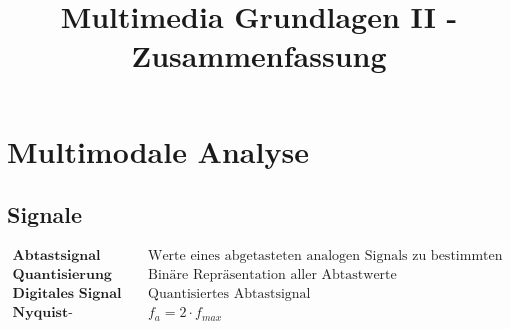 \documentclass{article}
\title{Multimedia Grundlagen II - Zusammenfassung}
\begin{document}
			\section*{Multimodale Analyse}
				\subsection*{Signale}
					\begin{align*}
						\textbf{Abtastsignal } & \text{Werte eines abgetasteten analogen Signals zu bestimmten Zeitpunkten}\\
						\textbf{Quantisierung } & \text{Bin\"are Repr\"asentation aller Abtastwerte}\\
						\textbf{Digitales Signal } & \text{Quantisiertes Abtastsignal}\\
						\textbf{Nyquist-Frequenz } & f_a = 2 \cdot f_{max}\\
					\end{align*}
\end{document}
